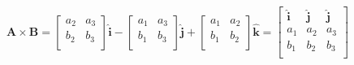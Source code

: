 \begin{equation}
    \boldsymbol{A} \times \boldsymbol{B} =
    \begin{bmatrix}
        a_2 & a_3 \\
        b_2 & b_3 \\
    \end{bmatrix} \boldsymbol{\hat{i}} -
    \begin{bmatrix}
        a_1 & a_3 \\
        b_1 & b_3 \\
    \end{bmatrix} \boldsymbol{\hat{j}} +
    \begin{bmatrix}
        a_1 & a_2 \\
        b_1 & b_2 \\
    \end{bmatrix} \boldsymbol{\hat{k}} =
    \begin{bmatrix}
        \boldsymbol{\hat{i}} & \boldsymbol{\hat{j}} & \boldsymbol{\hat{j}} \\
        a_1 & a_2 & a_3 \\
        b_1 & b_2 & b_3 \\
    \end{bmatrix}
\end{equation}